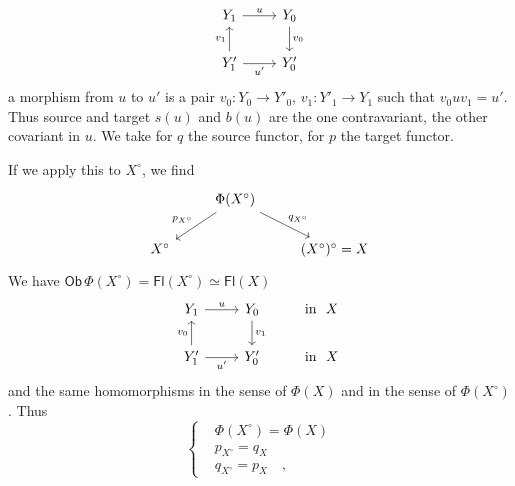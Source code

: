 \documentclass[11pt]{article}
\newcommand{\msp}[1]{\marginpar{\footnotesize [#1]}}
\newcommand{\Ob}{\mathsf{Ob}}
\newcommand{\Fl}{\mathsf{Fl}}
\begin{document}
\msp{page 73}
\[
\begin{tikzcd}
Y_1 \arrow[r, "u"] & Y_0 \arrow[d, "v_0"] \\
Y'_1 \arrow[u, "v_1"] \arrow[r, "u'"{swap}] & Y'_0
\end{tikzcd}
\]
a morphism from $u$ to $u'$ is a pair $v_0 : Y_0 \to Y'_0$, $v_1 : Y'_1 \to Y_1$ such that $v_0uv_1 = u'$. Thus source and target $s(u)$ and $b(u)$ are the one contravariant, the other covariant in $u$. We take for $q$ the source functor, for $p$ the target functor. %

If we apply this to $X^{\circ}$, we find
\[
\begin{tikzcd}
& \Phi(X^{\circ}) \arrow[dl, "p_{X^{\circ}}"{swap}] \arrow[dr, "q_{X^{\circ}}"] & \\
X^{\circ} & & (X^{\circ})^{\circ} = X
\end{tikzcd}
\]
We have $\Ob\, \Phi(X^{\circ}) = \Fl(X^{\circ}) \simeq \Fl(X)$
\[
\begin{tikzcd}
Y_1 \arrow[r, "u"] & Y_0 \arrow[d, "v_1"] & \text{in}\ \ X \\
Y'_1 \arrow[u, "v_0"] \arrow[r, "u'"{swap}] & Y'_0 & \text{in}\ \ X
\end{tikzcd}
\]
and the same homomorphisms in the sense of $\Phi(X)$ and in the sense of $\Phi(X^{\circ})$. Thus
\[
\left\{
\begin{aligned}
&\Phi(X^{\circ}) = \Phi(X) \\
&p_{X^{\circ}} = q_X \\
&q_{X^{\circ}} = p_X \quad ,
\end{aligned}
\right.
\]
\end{document}
